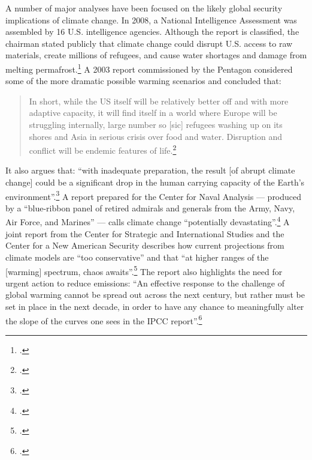 A number of major analyses have been focused on the likely global security implications of climate change.
In 2008, a National Intelligence Assessment was assembled by 16 U.S. intelligence agencies.
Although the report is classified, the chairman stated publicly that climate change could disrupt U.S. access to raw materials, create millions of refugees, and cause water shortages and damage from melting permafrost.\footcite[][]{Craven}
A 2003 report commissioned by the Pentagon considered some of the more dramatic possible warming scenarios and concluded that:
\begin{quote}
In short, while the US itself will be relatively better off and with more adaptive capacity, it will find itself in a world where Europe will be struggling internally, large number so [sic] refugees washing up on its shores and Asia in serious crisis over food and water. Disruption and conflict will be endemic features of life.\footcite[][p. 22]{AbruptCCScenario}
\end{quote}
It also argues that: ``with inadequate preparation, the result [of abrupt climate change] could be a significant drop in the human carrying capacity of the Earth’s environment''.\footcite[][p. 1]{AbruptCCScenario}
A report prepared for the Center for Naval Analysis --- produced by a ``blue-ribbon panel of retired admirals and generals from the Army, Navy, Air Force, and Marines'' --- calls climate change ``potentially devastating''.\footcite[][p. 3]{NationalSecurityCC}
A joint report from the Center for Strategic and International Studies and the Center for a New American Security describes how current projections from climate models are ``too conservative'' and that ``at higher ranges of the [warming] spectrum, chaos awaits''.\footcite[][p. 78]{AgeOfConsequences}
The report also highlights the need for urgent action to reduce emissions: ``An effective response to the challenge of global warming cannot be spread out across the next century, but rather must be set in place in the next decade, in order to have any chance to meaningfully alter the slope of the curves one sees in the IPCC report''.\footcite[][p. 78]{AgeOfConsequences}



